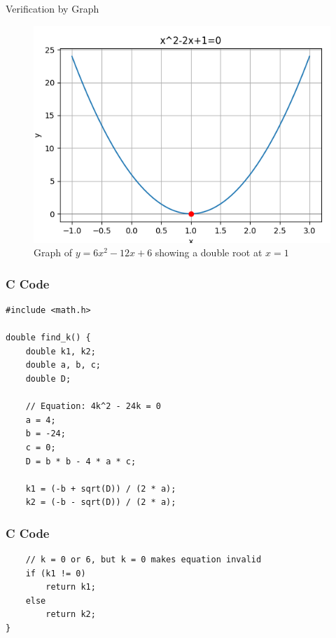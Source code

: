 \documentclass{beamer}
\begin{document}
\begin{frame}{Verification by Graph}
\begin{figure}[ht!]
\centering
\includegraphics[height=0.6\textheight, keepaspectratio]{figs/parabola.png}
\caption{Graph of $y = 6x^2 - 12x + 6$ showing a double root at $x=1$}
\end{figure}
\end{frame}

\begin{frame}[fragile]
    \frametitle{C Code}
\begin{lstlisting}
#include <math.h>

double find_k() {
    double k1, k2;     
    double a, b, c;    
    double D;          

    // Equation: 4k^2 - 24k = 0
    a = 4;
    b = -24;
    c = 0;
    D = b * b - 4 * a * c;

    k1 = (-b + sqrt(D)) / (2 * a);
    k2 = (-b - sqrt(D)) / (2 * a);

\end{lstlisting}
\end{frame}

\begin{frame}[fragile]
    \frametitle{C Code}
\begin{lstlisting}
    // k = 0 or 6, but k = 0 makes equation invalid
    if (k1 != 0)
        return k1;
    else
        return k2;
}

\end{lstlisting}
\end{frame}
\end{document}
